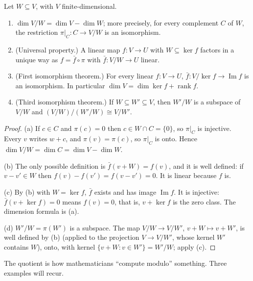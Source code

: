 \begin{theorem}[quotients]\label{linear:thm:quotient}
Let $W\subseteq V$, with $V$ finite-dimensional.
\begin{enumerate}[label=(\alph*)]
\item $\dim V/W=\dim V-\dim W$; more precisely, for every complement $C$ of $W$, the restriction $\pi|_C:C\to V/W$ is an
isomorphism.
\item (Universal property.) A linear map $f:V\to U$ with $W\subseteq\ker f$ factors in a unique way as $f=\bar f\circ\pi$
with $\bar f:V/W\to U$ linear.
\item (First isomorphism theorem.) For every linear $f:V\to U$, $\bar f:V/\ker f\to\operatorname{Im}f$ is an
isomorphism. In particular $\dim V=\dim\ker f+\operatorname{rank}f$.
\item (Third isomorphism theorem.) If $W\subseteq W'\subseteq V$, then $W'/W$ is a subspace of $V/W$ and
$(V/W)/(W'/W)\cong V/W'$.
\end{enumerate}
\end{theorem}
\begin{proof}
(a) If $c\in C$ and $\pi(c)=0$ then $c\in W\cap C=\{0\}$, so $\pi|_C$ is injective. Every $v$ writes $w+c$, and
$\pi(v)=\pi(c)$, so $\pi|_C$ is onto. Hence $\dim V/W=\dim C=\dim V-\dim W$.

(b) The only possible definition is $\bar f(v+W)=f(v)$, and it is well defined: if $v-v'\in W$ then $f(v)-f(v')=f(v-v')=0$.
It is linear because $f$ is.

(c) By (b) with $W=\ker f$, $\bar f$ exists and has image $\operatorname{Im}f$. It is injective: $\bar f(v+\ker f)=0$ means
$f(v)=0$, that is, $v+\ker f$ is the zero class. The dimension formula is (a).

(d) $W'/W=\pi(W')$ is a subspace. The map $V/W\to V/W'$, $v+W\mapsto v+W'$, is well defined by (b) (applied to the
projection $V\to V/W'$, whose kernel $W'$ contains $W$), onto, with kernel $\{v+W:v\in W'\}=W'/W$; apply (c).
\end{proof}

The quotient is how mathematicians ``compute modulo'' something. Three examples will recur.

